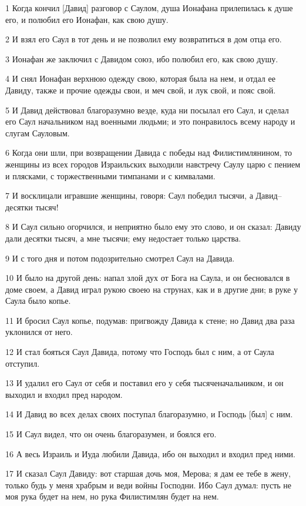 \par 1 Когда кончил [Давид] разговор с Саулом, душа Ионафана прилепилась к душе его, и полюбил его Ионафан, как свою душу.
\par 2 И взял его Саул в тот день и не позволил ему возвратиться в дом отца его.
\par 3 Ионафан же заключил с Давидом союз, ибо полюбил его, как свою душу.
\par 4 И снял Ионафан верхнюю одежду свою, которая была на нем, и отдал ее Давиду, также и прочие одежды свои, и меч свой, и лук свой, и пояс свой.
\par 5 И Давид действовал благоразумно везде, куда ни посылал его Саул, и сделал его Саул начальником над военными людьми; и это понравилось всему народу и слугам Сауловым.
\par 6 Когда они шли, при возвращении Давида с победы над Филистимлянином, то женщины из всех городов Израильских выходили навстречу Саулу царю с пением и плясками, с торжественными тимпанами и с кимвалами.
\par 7 И восклицали игравшие женщины, говоря: Саул победил тысячи, а Давид--десятки тысяч!
\par 8 И Саул сильно огорчился, и неприятно было ему это слово, и он сказал: Давиду дали десятки тысяч, а мне тысячи; ему недостает только царства.
\par 9 И с того дня и потом подозрительно смотрел Саул на Давида.
\par 10 И было на другой день: напал злой дух от Бога на Саула, и он бесновался в доме своем, а Давид играл рукою своею на струнах, как и в другие дни; в руке у Саула было копье.
\par 11 И бросил Саул копье, подумав: пригвожду Давида к стене; но Давид два раза уклонился от него.
\par 12 И стал бояться Саул Давида, потому что Господь был с ним, а от Саула отступил.
\par 13 И удалил его Саул от себя и поставил его у себя тысяченачальником, и он выходил и входил пред народом.
\par 14 И Давид во всех делах своих поступал благоразумно, и Господь [был] с ним.
\par 15 И Саул видел, что он очень благоразумен, и боялся его.
\par 16 А весь Израиль и Иуда любили Давида, ибо он выходил и входил пред ними.
\par 17 И сказал Саул Давиду: вот старшая дочь моя, Мерова; я дам ее тебе в жену, только будь у меня храбрым и веди войны Господни. Ибо Саул думал: пусть не моя рука будет на нем, но рука Филистимлян будет на нем.
